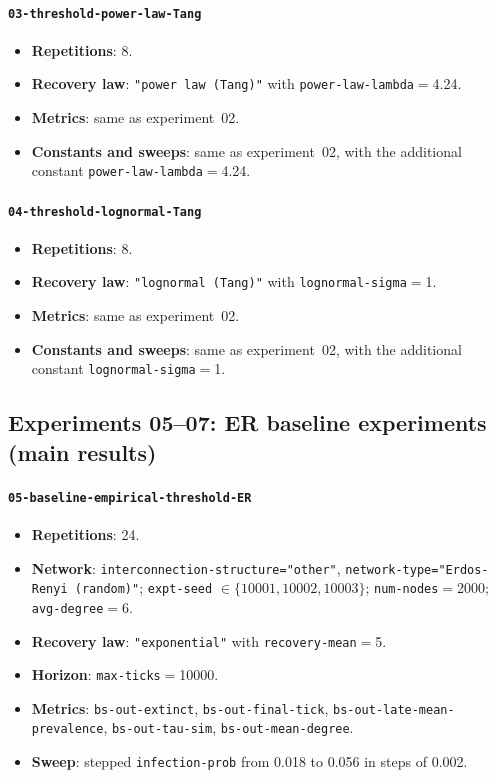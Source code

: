 \documentclass[11pt,a4paper]{article}
\begin{document}
\paragraph{\texttt{03-threshold-power-law-Tang}}
\begin{itemize}[leftmargin=*]
  \item \textbf{Repetitions}: 8.
  \item \textbf{Recovery law}: \texttt{"power law (Tang)"} with \texttt{power-law-lambda}$=$4.24.
  \item \textbf{Metrics}: same as experiment~02.
  \item \textbf{Constants and sweeps}: same as experiment~02, with the additional constant \texttt{power-law-lambda}$=$4.24.
\end{itemize}

\paragraph{\texttt{04-threshold-lognormal-Tang}}
\begin{itemize}[leftmargin=*]
  \item \textbf{Repetitions}: 8.
  \item \textbf{Recovery law}: \texttt{"lognormal (Tang)"} with \texttt{lognormal-sigma}$=$1.
  \item \textbf{Metrics}: same as experiment~02.
  \item \textbf{Constants and sweeps}: same as experiment~02, with the additional constant \texttt{lognormal-sigma}$=$1.
\end{itemize}

\subsection{Experiments 05--07: ER baseline experiments (main results)}
\paragraph{\texttt{05-baseline-empirical-threshold-ER}}
\begin{itemize}[leftmargin=*]
  \item \textbf{Repetitions}: 24.
  \item \textbf{Network}: \texttt{interconnection-structure="other"}, \texttt{network-type="Erdos-Renyi (random)"}; \texttt{expt-seed} $\in\{10001,10002,10003\}$; \texttt{num-nodes}$=$2000; \texttt{avg-degree}$=$6.
  \item \textbf{Recovery law}: \texttt{"exponential"} with \texttt{recovery-mean}$=$5.
  \item \textbf{Horizon}: \texttt{max-ticks}$=$10000.
  \item \textbf{Metrics}: \texttt{bs-out-extinct}, \texttt{bs-out-final-tick}, \texttt{bs-out-late-mean-prevalence}, \texttt{bs-out-tau-sim}, \texttt{bs-out-mean-degree}.
  \item \textbf{Sweep}: stepped \texttt{infection-prob} from 0.018 to 0.056 in steps of 0.002.
\end{itemize}
\end{document}
